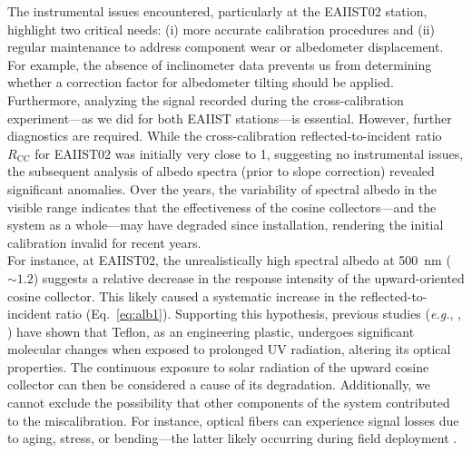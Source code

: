 \documentclass[11pt,a4paper]{article}
\newcommand{\eg}{\emph{e.g.}, }
\begin{document}
The instrumental issues encountered, particularly at the EAIIST02 station, highlight two critical needs: (i) more accurate calibration procedures and (ii) regular maintenance to address component wear or albedometer displacement. For example, the absence of inclinometer data prevents us from determining whether a correction factor for albedometer tilting should be applied. \\
Furthermore, analyzing the signal recorded during the cross-calibration experiment---as we did for both EAIIST stations---is essential. However, further diagnostics are required. While the cross-calibration reflected-to-incident ratio $R_\mathrm{CC}$ for EAIIST02 was initially very close to 1, suggesting no instrumental issues, the subsequent analysis of albedo spectra (prior to slope correction) revealed significant anomalies. Over the years, the variability of spectral albedo in the visible range indicates that the effectiveness of the cosine collectors---and the system as a whole---may have degraded since installation, rendering the initial calibration invalid for recent years. \\
For instance, at EAIIST02, the unrealistically high spectral albedo at \qty{500}{\nano\meter} ($\sim 1.2$) suggests a relative decrease in the response intensity of the upward-oriented cosine collector. This likely caused a systematic increase in the reflected-to-incident ratio (Eq.~\eqref{eq:alb1}). Supporting this hypothesis, previous studies (\eg, \cite{Liu2022EffectsOU}) have shown that Teflon, as an engineering plastic, undergoes significant molecular changes when exposed to prolonged UV radiation, altering its optical properties. The continuous exposure to solar radiation of the upward cosine collector can then be considered a cause of its degradation. Additionally, we cannot exclude the possibility that other components of the system contributed to the miscalibration. For instance, optical fibers can experience signal losses due to aging, stress, or bending---the latter likely occurring during field deployment \parencite{bunge3BasicPrinciples2017}.
	
\end{document}
